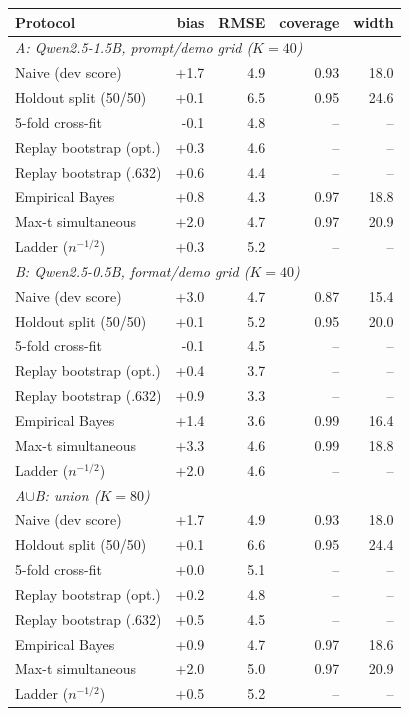 \begin{tabular}{lrrrr}\toprule
Protocol & bias & RMSE & coverage & width \\\midrule
\multicolumn{5}{l}{\emph{A: Qwen2.5-1.5B, prompt/demo grid ($K{=}40$)}} \\
Naive (dev score) & +1.7 & 4.9 & 0.93 & 18.0 \\
Holdout split (50/50) & +0.1 & 6.5 & 0.95 & 24.6 \\
5-fold cross-fit & -0.1 & 4.8 & -- & -- \\
Replay bootstrap (opt.) & +0.3 & 4.6 & -- & -- \\
Replay bootstrap (.632) & +0.6 & 4.4 & -- & -- \\
Empirical Bayes & +0.8 & 4.3 & 0.97 & 18.8 \\
Max-t simultaneous & +2.0 & 4.7 & 0.97 & 20.9 \\
Ladder ($n^{-1/2}$) & +0.3 & 5.2 & -- & -- \\
\multicolumn{5}{l}{\emph{B: Qwen2.5-0.5B, format/demo grid ($K{=}40$)}} \\
Naive (dev score) & +3.0 & 4.7 & 0.87 & 15.4 \\
Holdout split (50/50) & +0.1 & 5.2 & 0.95 & 20.0 \\
5-fold cross-fit & -0.1 & 4.5 & -- & -- \\
Replay bootstrap (opt.) & +0.4 & 3.7 & -- & -- \\
Replay bootstrap (.632) & +0.9 & 3.3 & -- & -- \\
Empirical Bayes & +1.4 & 3.6 & 0.99 & 16.4 \\
Max-t simultaneous & +3.3 & 4.6 & 0.99 & 18.8 \\
Ladder ($n^{-1/2}$) & +2.0 & 4.6 & -- & -- \\
\multicolumn{5}{l}{\emph{A$\cup$B: union ($K{=}80$)}} \\
Naive (dev score) & +1.7 & 4.9 & 0.93 & 18.0 \\
Holdout split (50/50) & +0.1 & 6.6 & 0.95 & 24.4 \\
5-fold cross-fit & +0.0 & 5.1 & -- & -- \\
Replay bootstrap (opt.) & +0.2 & 4.8 & -- & -- \\
Replay bootstrap (.632) & +0.5 & 4.5 & -- & -- \\
Empirical Bayes & +0.9 & 4.7 & 0.97 & 18.6 \\
Max-t simultaneous & +2.0 & 5.0 & 0.97 & 20.9 \\
Ladder ($n^{-1/2}$) & +0.5 & 5.2 & -- & -- \\
\bottomrule
\end{tabular}
